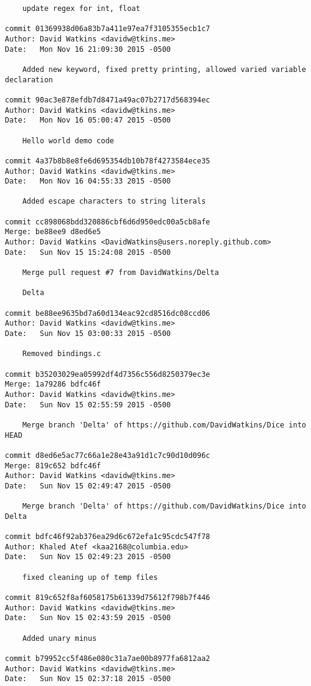 \begin{verbatim}
    update regex for int, float

commit 01369938d06a83b7a411e97ea7f3105355ecb1c7
Author: David Watkins <davidw@tkins.me>
Date:   Mon Nov 16 21:09:30 2015 -0500

    Added new keyword, fixed pretty printing, allowed varied variable declaration

commit 90ac3e878efdb7d8471a49ac07b2717d568394ec
Author: David Watkins <davidw@tkins.me>
Date:   Mon Nov 16 05:00:47 2015 -0500

    Hello world demo code

commit 4a37b8b8e8fe6d695354db10b78f4273584ece35
Author: David Watkins <davidw@tkins.me>
Date:   Mon Nov 16 04:55:33 2015 -0500

    Added escape characters to string literals

commit cc898068bdd320886cbf6d6d950edc00a5cb8afe
Merge: be88ee9 d8ed6e5
Author: David Watkins <DavidWatkins@users.noreply.github.com>
Date:   Sun Nov 15 15:24:08 2015 -0500

    Merge pull request #7 from DavidWatkins/Delta
    
    Delta

commit be88ee9635bd7a60d134eac92cd8516dc08ccd06
Author: David Watkins <davidw@tkins.me>
Date:   Sun Nov 15 03:00:33 2015 -0500

    Removed bindings.c

commit b35203029ea05992df4d7356c556d8250379ec3e
Merge: 1a79286 bdfc46f
Author: David Watkins <davidw@tkins.me>
Date:   Sun Nov 15 02:55:59 2015 -0500

    Merge branch 'Delta' of https://github.com/DavidWatkins/Dice into HEAD

commit d8ed6e5ac77c66a1e28e43a91d1c7c90d10d096c
Merge: 819c652 bdfc46f
Author: David Watkins <davidw@tkins.me>
Date:   Sun Nov 15 02:49:47 2015 -0500

    Merge branch 'Delta' of https://github.com/DavidWatkins/Dice into Delta

commit bdfc46f92ab376ea29d6c672efa1c95cdc547f78
Author: Khaled Atef <kaa2168@columbia.edu>
Date:   Sun Nov 15 02:49:23 2015 -0500

    fixed cleaning up of temp files

commit 819c652f8af6058175b61339d75612f798b7f446
Author: David Watkins <davidw@tkins.me>
Date:   Sun Nov 15 02:43:59 2015 -0500

    Added unary minus

commit b79952cc5f486e080c31a7ae00b8977fa6812aa2
Author: David Watkins <davidw@tkins.me>
Date:   Sun Nov 15 02:37:18 2015 -0500


\end{verbatim}
